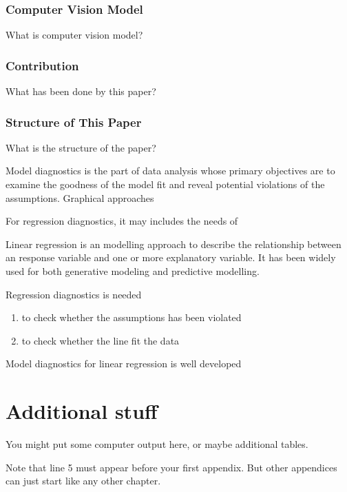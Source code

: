 \documentclass{monashthesis}
\begin{document}
\hypertarget{computer-vision-model}{%
\subsection{Computer Vision Model}\label{computer-vision-model}}

What is computer vision model?

\hypertarget{contribution}{%
\subsection{Contribution}\label{contribution}}

What has been done by this paper?

\hypertarget{structure-of-this-paper}{%
\subsection{Structure of This Paper}\label{structure-of-this-paper}}

What is the structure of the paper?

Model diagnostics is the part of data analysis whose primary objectives are to examine the goodness of the model fit and reveal potential violations of the assumptions. Graphical approaches

For regression diagnostics, it may includes the needs of

Linear regression is an modelling approach to describe the relationship between an response variable and one or more explanatory variable. It has been widely used for both generative modeling and predictive modelling.

Regression diagnostics is needed

\begin{enumerate}
\def\labelenumi{\arabic{enumi}.}
\tightlist
\item
  to check whether the assumptions has been violated
\item
  to check whether the line fit the data
\end{enumerate}

Model diagnostics for linear regression is well developed

\appendix

\hypertarget{additional-stuff}{%
\chapter{Additional stuff}\label{additional-stuff}}

You might put some computer output here, or maybe additional tables.

Note that line 5 must appear before your first appendix. But other appendices can just start like any other chapter.

\printbibliography[heading=bibintoc]
\end{document}
